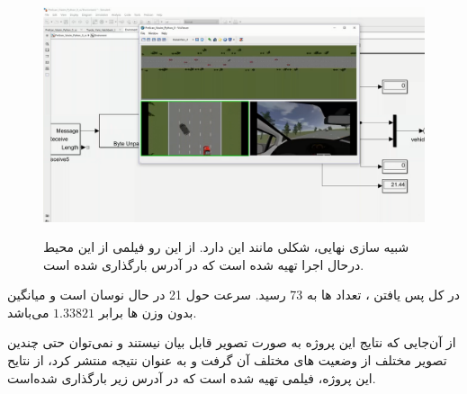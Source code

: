\begin{figure}
	\centering
	\href{https://youtu.be/chgpBWU9XCA}{\includegraphics[width=0.7\linewidth]{Figures/OBS/resault}}
	\caption[تصویر شبیه‌سازی نهایی]{
		شبیه سازی نهایی، شکلی مانند این دارد. از این رو فیلمی از این محیط درحال اجرا تهیه شده است که در آدرس
		بارگذاری شده است.		
	}	
	\label{fig:resault}
\end{figure}

در کل پس یافتن ، تعداد ها به 73 رسید. سرعت  حول 21 در حال نوسان است و میانگین بدون وزن ها برابر $1.33821$ می‌باشد.

از آن‌جایی که نتایج این پروژه به صورت تصویر قابل بیان نیستند و نمی‌توان حتی چندین تصویر مختلف از وضعیت های مختلف آن گرفت و به عنوان نتیجه منتشر کرد، 
از نتایح این پروژه، فیلمی تهیه شده است که در آدرس زیر بارگذاری شده‌است.
\begin{center}
\end{center}


\TheEnd























